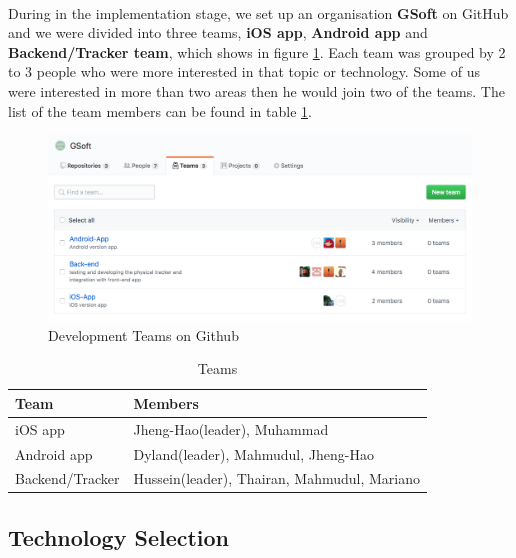 \documentclass[12pt,a4paper]{article}
\begin{document}
        \paragraph{}During in the implementation stage, we set up an organisation {\bf GSoft} on GitHub and we were divided into three teams, {\bf iOS app}, {\bf Android app} and {\bf Backend/Tracker team}, which shows in figure \ref{fig:Development Teams}. Each team was grouped by 2 to 3 people who were more interested in that topic or technology. Some of us were interested in more than two areas then he would join two of the teams. The list of the team members can be found in table \ref{table:Teams}. 
        \begin{figure}[H]
          \centering
          \includegraphics[width=1\textwidth]{../assets/development-records-teams.png}
          \caption{Development Teams on Github}
          \label{fig:Development Teams}
        \end{figure}

        \begin{table}[H]
          \centering
            \begin{tabularx}{\textwidth}{l X}
              \hline
               Team & Members \\ \hline
               iOS app & Jheng-Hao(leader), Muhammad \\
               Android app & Dyland(leader), Mahmudul, Jheng-Hao \\ 
               Backend/Tracker  & Hussein(leader), Thairan, Mahmudul, Mariano \\
              \hline
            \end{tabularx}
            \caption[Table caption text]{Teams}
            \label{table:Teams}
        \end{table}        

      \subsection{Technology Selection} 
\end{document}
